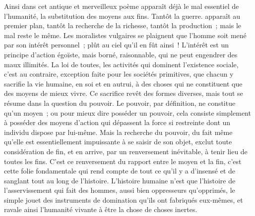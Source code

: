 \documentclass[french,twoside]{book} %
\begin{document}
Ainsi dans cet antique et merveilleux poème apparaît déjà le mal essentiel de l'humanité, la substitution des moyens aux fins. Tantôt la guerre. apparaît au premier plan, tantôt la recherche de la richesse, tantôt la production ; mais le mal reste le même. Les moralistes vulgaires se plaignent que l'homme soit mené par son intérêt personnel ; plût au ciel qu'il en fût ainsi ! L'intérêt est un principe d'action égoïste, mais borné, raisonnable, qui ne peut engendrer des maux illimités. La loi de toutes, les activités qui dominent l'existence sociale, c'est au contraire, exception faite pour les sociétés primitives, que chacun y sacrifie la vie humaine, en soi et en autrui, à des choses qui ne constituent que des moyens de mieux vivre. Ce sacrifice revêt des formes diverses, mais tout se résume dans la question du pouvoir. Le pouvoir, par définition, ne constitue qu'un moyen ; ou pour mieux dire posséder un pouvoir, cela consiste simplement à posséder des moyens d'action qui dépassent la force si restreinte dont un individu dispose par lui-même. Mais la recherche du pouvoir, du fait même qu'elle est essentiellement impuissante à se saisir de son objet, exclut toute considération de fin, et en arrive, par un renversement inévitable, à tenir lieu de toutes les fins. C'est ce renversement du rapport entre le moyen et la fin, c'est cette folie fondamentale qui rend compte de tout ce qu'il y a d'insensé et de sanglant tout au long de l'histoire. L'histoire humaine n'est que l'histoire de l'asservissement qui fait des hommes, aussi bien oppresseurs qu'opprimés, le simple jouet des instruments de domination qu'ils ont fabriqués eux-mêmes, et ravale ainsi l'humanité vivante à être la chose de choses inertes.\par
\end{document}
